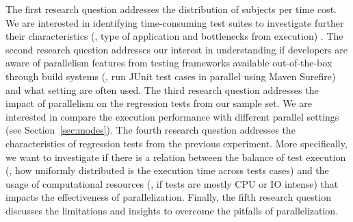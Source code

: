
The first research question addresses the distribution of subjects per
time cost. We are interested in identifying time-consuming test suites
to investigate further their characteristics (\eg, type of application
and bottlenecks from execution) .  The
second research question addresses our interest in understanding if
developers are aware of parallelism features from testing frameworks
available out-of-the-box through build systems (\eg, run JUnit test
cases in parallel using Maven Surefire) and what setting are often
used. The third research question addresses the impact of parallelism
on the regression tests from our sample set. We are interested in
compare the execution performance with different parallel settings
(see Section~\ref{sec:modes}). The fourth research question addresses
the characteristics of regression tests from the previous experiment.
More specifically, we want to investigate if there is a relation
between the balance of test execution (\ie, how uniformly distributed
is the execution time across tests cases) and the usage of
computational resources (\ie, if tests are mostly CPU or IO intense)
that impacts the effectiveness of parallelization. Finally, the fifth
research question discusses the limitations and insights to overcome
the pitfalls of parallelization.


